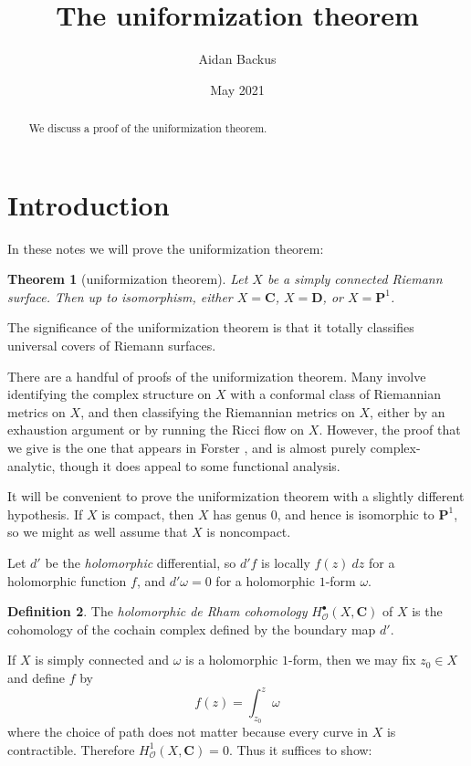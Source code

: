 \documentclass[reqno,12pt,letterpaper]{amsart}
\title[Uniformization]{The uniformization theorem}
\author{Aidan Backus}
\date{May 2021}
\newcommand{\CC}{\mathbf{C}}
\newcommand{\DD}{\mathbf{D}}
\newcommand{\PP}{\mathbf P}
\newcommand{\dfn}[1]{\emph{#1}\index{#1}}
\newcommand{\Olo}{\mathscr O}
\newtheorem{theorem}{Theorem}[section]
\theoremstyle{definition}
\newtheorem{definition}[theorem]{Definition}
\begin{document}
\begin{abstract}
We discuss a proof of the uniformization theorem.
\end{abstract}

\maketitle

\section{Introduction}
In these notes we will prove the uniformization theorem:

\begin{theorem}[uniformization theorem]
Let $X$ be a simply connected Riemann surface. Then up to isomorphism, either $X = \CC$, $X = \DD$, or $X = \PP^1$.
\end{theorem}

The significance of the uniformization theorem is that it totally classifies universal covers of Riemann surfaces.

There are a handful of proofs of the uniformization theorem.
Many involve identifying the complex structure on $X$ with a conformal class of Riemannian metrics on $X$, and then classifying the Riemannian metrics on $X$, either by an exhaustion argument or by running the Ricci flow on $X$.
However, the proof that we give is the one that appears in Forster \cite[Chapter 3]{gilligan2012lectures}, and is almost purely complex-analytic, though it does appeal to some functional analysis.

It will be convenient to prove the uniformization theorem with a slightly different hypothesis.
If $X$ is compact, then $X$ has genus $0$, and hence is isomorphic to $\PP^1$, so we might as well assume that $X$ is noncompact.

Let $d'$ be the \emph{holomorphic} differential, so $d'f$ is locally $f(z) ~dz$ for a holomorphic function $f$, and $d'\omega = 0$ for a holomorphic $1$-form $\omega$.

\begin{definition}
The \dfn{holomorphic de Rham cohomology} $H^\bullet_\Olo(X, \CC)$ of $X$ is the cohomology of the cochain complex defined by the boundary map $d'$.
\end{definition}

If $X$ is simply connected and $\omega$ is a holomorphic $1$-form, then we may fix $z_0 \in X$ and define $f$ by
$$f(z) = \int_{z_0}^z \omega$$
where the choice of path does not matter because every curve in $X$ is contractible.
Therefore $H^1_\Olo(X, \CC) = 0$.
Thus it suffices to show:
\end{document}
